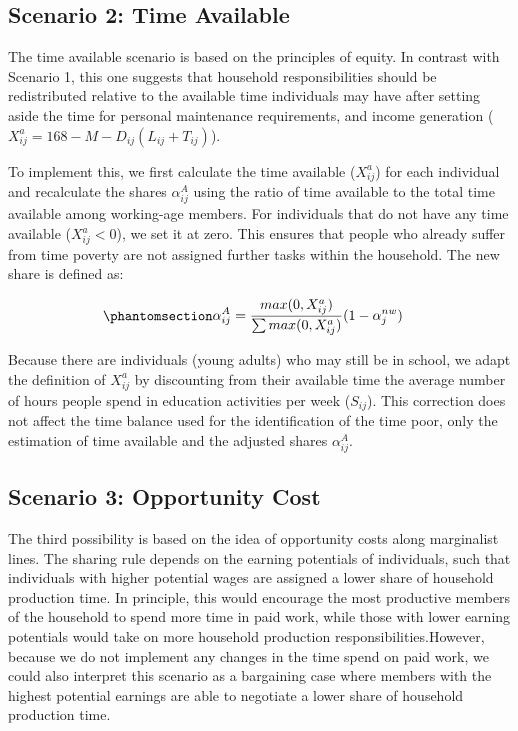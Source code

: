 \documentclass[
  11pt,
]{article}
\begin{document}
\subsection{Scenario 2: Time Available}\label{scenario-2-time-available}

The time available scenario is based on the principles of equity. In
contrast with Scenario 1, this one suggests that household
responsibilities should be redistributed relative to the available time
individuals may have after setting aside the time for personal
maintenance requirements, and income generation
(\(X^a_{ij}=168-M-D_{ij}(L_{ij}+T_{ij})\)).

To implement this, we first calculate the time available (\(X^a_{ij}\))
for each individual and recalculate the shares \(\alpha_{ij}^A\) using
the ratio of time available to the total time available among
working-age members. For individuals that do not have any time available
(\(X^a_{ij}<0\)), we set it at zero. This ensures that people who
already suffer from time poverty are not assigned further tasks within
the household. The new share is defined as:

\begin{equation}\phantomsection\label{eq-r2}{
\begin{aligned}
\alpha_{ij}^A &= \frac{max(0,X^a_{ij})}{\sum max(0,X^a_{ij})} (1-\alpha_{j}^{nw})
\end{aligned}
}\end{equation}

Because there are individuals (young adults) who may still be in school,
we adapt the definition of \(X^a_{ij}\) by discounting from their
available time the average number of hours people spend in education
activities per week (\(S_{ij}\)). This correction does not affect the
time balance used for the identification of the time poor, only the
estimation of time available and the adjusted shares \(\alpha_{ij}^A\).

\subsection{Scenario 3: Opportunity
Cost}\label{scenario-3-opportunity-cost}

The third possibility is based on the idea of opportunity costs along
marginalist lines. The sharing rule depends on the earning potentials of
individuals, such that individuals with higher potential wages are
assigned a lower share of household production time. In principle, this
would encourage the most productive members of the household to spend
more time in paid work, while those with lower earning potentials would
take on more household production responsibilities.However, because we
do not implement any changes in the time spend on paid work, we could
also interpret this scenario as a bargaining case where members with the
highest potential earnings are able to negotiate a lower share of
household production time.
\end{document}
